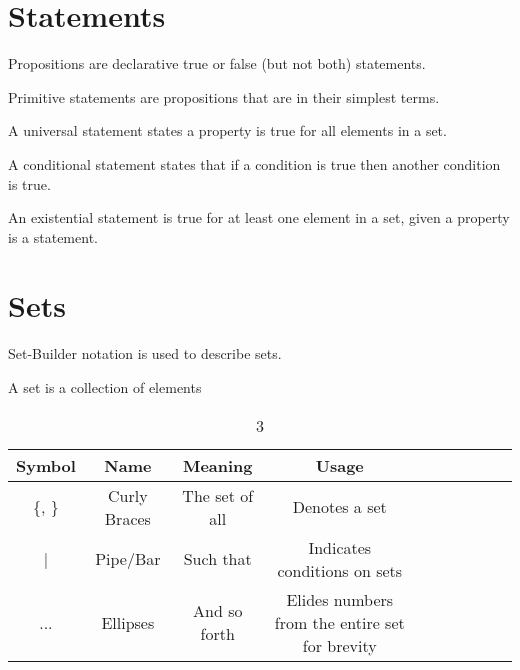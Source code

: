 \documentclass{article}
\theoremstyle{definition}
\begin{document}
\section{Statements}

\begin{definition}[props]\label{def:props}
Propositions are declarative true or false (but not both) statements.
\end{definition}

\begin{definition}[prims]\label{def:prims}
Primitive statements are propositions that are in their simplest terms.
\end{definition}

\begin{definition}\label{def:universal-stmts}
A universal statement states a property is true for all elements in a set.
\end{definition}

\begin{definition}\label{def:cond-stmts}
A conditional statement states that if a condition is true then another condition is true.
\end{definition}

\begin{definition}\label{def:exist-stmts}
An existential statement is true for at least one element in a set, given a property is a statement.
\end{definition}

\section{Sets}

Set-Builder notation is used to describe sets.

\begin{definition}[set]\label{def:set}
A set is a collection of elements
\end{definition}

\begin{table}[!htbp]
    \centering
    \begin{tabular}{ *{5}{cc} }
        \toprule
        Symbol  & Name          & Meaning           & Usage \\
        \midrule
        \{, \}  & Curly Braces  & The set of all    & Denotes a set \\
        |       & Pipe/Bar      & Such that         & Indicates conditions on sets \\
        ...     & Ellipses      & And so forth      & Elides numbers from the entire set for brevity \\
        \bottomrule
    \end{tabular}
    \label{tab:tbl1}
    \caption{3}
\end{table}
\end{document}
